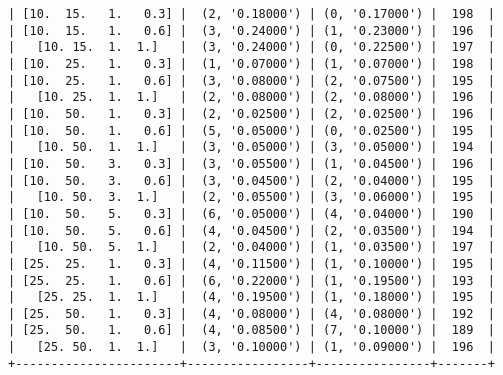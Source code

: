 \documentclass{article}
\begin{document}
\begin{verbatim}
| [10.  15.   1.   0.3] |  (2, '0.18000') | (0, '0.17000') |  198  |
| [10.  15.   1.   0.6] |  (3, '0.24000') | (1, '0.23000') |  196  |
|   [10. 15.  1.  1.]   |  (3, '0.24000') | (0, '0.22500') |  197  |
| [10.  25.   1.   0.3] |  (1, '0.07000') | (1, '0.07000') |  198  |
| [10.  25.   1.   0.6] |  (3, '0.08000') | (2, '0.07500') |  195  |
|   [10. 25.  1.  1.]   |  (2, '0.08000') | (2, '0.08000') |  196  |
| [10.  50.   1.   0.3] |  (2, '0.02500') | (2, '0.02500') |  196  |
| [10.  50.   1.   0.6] |  (5, '0.05000') | (0, '0.02500') |  195  |
|   [10. 50.  1.  1.]   |  (3, '0.05000') | (3, '0.05000') |  194  |
| [10.  50.   3.   0.3] |  (3, '0.05500') | (1, '0.04500') |  196  |
| [10.  50.   3.   0.6] |  (3, '0.04500') | (2, '0.04000') |  195  |
|   [10. 50.  3.  1.]   |  (2, '0.05500') | (3, '0.06000') |  195  |
| [10.  50.   5.   0.3] |  (6, '0.05000') | (4, '0.04000') |  190  |
| [10.  50.   5.   0.6] |  (4, '0.04500') | (2, '0.03500') |  194  |
|   [10. 50.  5.  1.]   |  (2, '0.04000') | (1, '0.03500') |  197  |
| [25.  25.   1.   0.3] |  (4, '0.11500') | (1, '0.10000') |  195  |
| [25.  25.   1.   0.6] |  (6, '0.22000') | (1, '0.19500') |  193  |
|   [25. 25.  1.  1.]   |  (4, '0.19500') | (1, '0.18000') |  195  |
| [25.  50.   1.   0.3] |  (4, '0.08000') | (4, '0.08000') |  192  |
| [25.  50.   1.   0.6] |  (4, '0.08500') | (7, '0.10000') |  189  |
|   [25. 50.  1.  1.]   |  (3, '0.10000') | (1, '0.09000') |  196  |
+-----------------------+-----------------+----------------+-------+
\end{verbatim}
\end{document}
